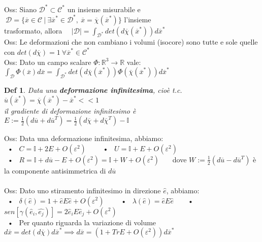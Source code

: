 \documentclass{article}
\theoremstyle{unnumbered}
\newtheorem* {theoremT}{Def}
\theoremstyle{unnumbered1}
\newenvironment{defi}{\begin{gBox}\begin{theoremT}}{\end{theoremT}\end{gBox}}
\begin{document}
%
Oss: Siano $\mathcal{D}^*\subset\mathcal{C}^* $ un insieme misurabile e $ \ \mathcal{D}=\{ \overline{x}\in\mathcal{C} \ | \ \exists \overline{x}^* \in \mathcal{D}^*, \ \overline{x}=\overline{\chi}(\overline{x}^*) \} $ l'insieme \\
\phantom{Oss: }trasformato, allora \ \ $ |\mathcal{D}|=\int_{\mathcal{D}^*}det(d\overline{\chi}(\overline{x}^*))d\overline{x}^*$ \\
%
Oss: Le deformazioni che non cambiano i volumi (isocore) sono tutte e sole quelle con $det(d\overline{\chi})=1 \ \forall \overline{x}^*\in\mathcal{C}^* $\\
%
Oss: Dato un campo scalare $\Phi:\mathbb{R}^3\rightarrow\mathbb{R}$ vale: \ $\int_{\mathcal{D}}\Phi(\overline{x})d\overline{x} = \int_{\mathcal{D}^*} det(d\overline{\chi}(\overline{x}^*))  \Phi(\overline{\chi}(\overline{x}^*))d\overline{x}^*$ \\
%
%
%
\begin{defi}
Data una \textbf{deformazione infinitesima}, cioè t.c. $\overline{u}(\overline{x}^*)=\overline{\chi}(\overline{x}^*) - \overline{x}^* <<1$ \\ il gradiente di deformazione infinitesimo è \ $E:=\frac12 (d\overline{u}+d\overline{u}^T)=\frac12 (d\overline{\chi} + d\overline{\chi}^T)-\mathbb{I}$
\end{defi}
%
%
Oss: Data una deformazione infinitesima, abbiamo:\\
\ • \ $C=\mathbb{I}+2E+O(\varepsilon^2)$ \ \ \ \ • \ $U=\mathbb{I}+E+O(\varepsilon^2)$\\
\ • \ $R=\mathbb{I}+d\overline{u}-E+O(\varepsilon^2)=\mathbb{I}+W+O(\varepsilon^2)$ \ \ \ dove $W:=\frac12 (d\overline{u}-d\overline{u}^T)$ è la componente antisimmetrica di $d\overline{u}$\\ \\
%
Oss: Dato uno stiramento infinitesimo in direzione $\hat{e}$, abbiamo:\\
\ • \ $\delta(\hat{e})= 1 + \hat{e}E\hat{e} +O(\varepsilon^2)$ \ \ \ \ • \ $\lambda(\hat{e})=\hat{e}E\hat{e}$\ \ \ \ • \ $sen[\gamma(\hat{e}_i,\hat{e_j})]=2\hat{e}_iE\hat{e}_j + O(\varepsilon^2)$\\
\ • \ Per quanto riguarda la variazione di volume \ $d\overline{x}=det(d\overline{\chi})d\overline{x}^* \implies d\overline{x}=(1+TrE+O(\varepsilon^2))d\overline{x}^*$
\end{document}
